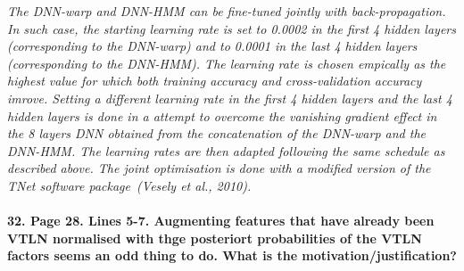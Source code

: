 \documentclass[]{article}
\begin{document}
\textit{The DNN-warp and DNN-HMM can be fine-tuned jointly with back-propagation. In such case, the starting learning rate is set to 0.0002 in the first 4 hidden layers (corresponding to the DNN-warp) and to 0.0001 in the last 4 hidden layers (corresponding to the DNN-HMM). The learning rate is chosen empically as the highest value for which both training accuracy and cross-validation accuracy imrove. Setting a different learning rate in the first 4 hidden layers and the last 4 hidden layers is done in a attempt to overcome the vanishing gradient effect in the 8 layers DNN obtained from the concatenation of the DNN-warp and the DNN-HMM. The learning rates are then adapted following the same schedule as described above. The joint optimisation is done with a modified version of the TNet software package~(Vesely et al., 2010).}
\paragraph{32. Page 28. Lines 5-7. Augmenting features that have already been VTLN normalised with thge posteriort probabilities of the VTLN factors seems an odd thing to do. What is the motivation/justification?}
\end{document}

